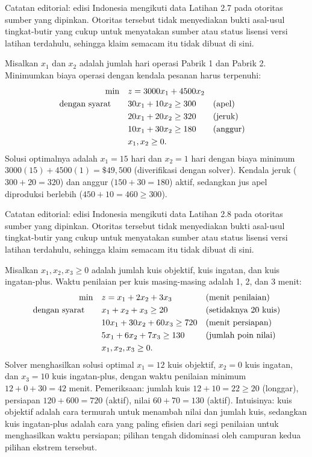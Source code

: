 \begin{qaflag}
Catatan editorial: edisi Indonesia mengikuti data Latihan 2.7 pada otoritas sumber yang dipinkan. Otoritas tersebut tidak menyediakan bukti asal-usul tingkat-butir yang cukup untuk menyatakan sumber atau status lisensi versi latihan terdahulu, sehingga klaim semacam itu tidak dibuat di sini.
\end{qaflag}


Misalkan $x_1$ dan $x_2$ adalah jumlah hari operasi Pabrik 1 dan Pabrik 2. Minimumkan biaya operasi dengan kendala pesanan harus terpenuhi:
\begin{align*}
\min \quad & z = 3000x_1 + 4500x_2\\
\mbox{dengan syarat}\quad \quad & 30x_1 + 10x_2 \geq 300 && \mbox{(apel)}\\
& 20x_1 + 20x_2 \geq 320 && \mbox{(jeruk)}\\
& 10x_1 + 30x_2 \geq 180 && \mbox{(anggur)}\\
& x_1, x_2 \geq 0.
\end{align*}
Solusi optimalnya adalah $x_1 = 15$ hari dan $x_2 = 1$ hari dengan biaya minimum $3000(15) + 4500(1) = \$49{,}500$ (diverifikasi dengan solver). Kendala jeruk ($300 + 20 = 320$) dan anggur ($150 + 30 = 180$) aktif, sedangkan jus apel diproduksi berlebih ($450 + 10 = 460 \geq 300$).

\begin{qaflag}
Catatan editorial: edisi Indonesia mengikuti data Latihan 2.8 pada otoritas sumber yang dipinkan. Otoritas tersebut tidak menyediakan bukti asal-usul tingkat-butir yang cukup untuk menyatakan sumber atau status lisensi versi latihan terdahulu, sehingga klaim semacam itu tidak dibuat di sini.
\end{qaflag}


Misalkan $x_1, x_2, x_3 \geq 0$ adalah jumlah kuis objektif, kuis ingatan, dan kuis ingatan-plus. Waktu penilaian per kuis masing-masing adalah 1, 2, dan 3 menit:
\begin{align*}
\min \quad & z = x_1 + 2x_2 + 3x_3 && \mbox{(menit penilaian)}\\
\mbox{dengan syarat}\quad \quad & x_1 + x_2 + x_3 \geq 20 && \mbox{(setidaknya 20 kuis)}\\
& 10x_1 + 30x_2 + 60x_3 \geq 720 && \mbox{(menit persiapan)}\\
& 5x_1 + 6x_2 + 7x_3 \geq 130 && \mbox{(jumlah poin nilai)}\\
& x_1, x_2, x_3 \geq 0.
\end{align*}
Solver menghasilkan solusi optimal $x_1 = 12$ kuis objektif, $x_2 = 0$ kuis ingatan, dan $x_3 = 10$ kuis ingatan-plus, dengan waktu penilaian minimum $12 + 0 + 30 = 42$ menit. Pemeriksaan: jumlah kuis $12 + 10 = 22 \geq 20$ (longgar), persiapan $120 + 600 = 720$ (aktif), nilai $60 + 70 = 130$ (aktif). Intuisinya: kuis objektif adalah cara termurah untuk menambah nilai dan jumlah kuis, sedangkan kuis ingatan-plus adalah cara yang paling efisien dari segi penilaian untuk menghasilkan waktu persiapan; pilihan tengah didominasi oleh campuran kedua pilihan ekstrem tersebut.

